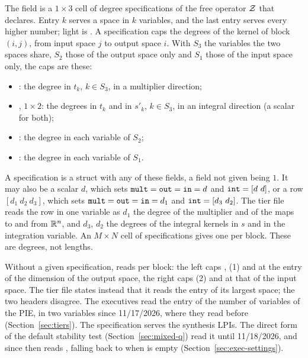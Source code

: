 The field  is a $1\times3$ cell of degree specifications of the free operator $\mathcal{Z}$ that  declares. Entry $k$ serves a space in $k$ variables, and the last entry serves every higher number; light is . A specification caps the degrees of the kernel of block $(i,j)$, from input space $j$ to output space $i$. With $S_3$ the variables the two spaces share, $S_2$ those of the output space only and $S_1$ those of the input space only, the caps are these:
\begin{itemize}\setlength\itemsep{0pt}
\item {}: the degree in $t_k$, $k\in S_3$, in a multiplier direction;
\item {}, $1\times2$: the degrees in $t_k$ and in $s'_k$, $k\in S_3$, in an integral direction (a scalar for both);
\item {}: the degree in each variable of $S_2$;
\item {}: the degree in each variable of $S_1$.
\end{itemize}
A specification is a struct with any of these fields, a field not given being $1$. It may also be a scalar $d$, which sets $\texttt{mult}=\texttt{out}=\texttt{in}=d$ and $\texttt{int}=[d\ d]$, or a row $[d_1\ d_2\ d_3]$, which sets $\texttt{mult}=\texttt{out}=\texttt{in}=d_1$ and $\texttt{int}=[d_3\ d_2]$. The tier file reads the row in one variable as $d_1$ the degree of the multiplier and of the maps to and from $\mathbb{R}^n$, and $d_3$, $d_2$ the degrees of the integral kernels in $s$ and in the integration variable. An $M\times N$ cell of specifications gives one per block. These are degrees, not lengths.

Without a given specification,  reads  per block: the left caps , (1) and  at the entry of the dimension of the output space, the right caps (2) and  at that of the input space. The tier file states instead that it reads the entry of its largest space; the two headers disagree. The executives read the entry of the number of variables of the PIE, in two variables  since 11/17/2026, where they read  before (Section~\ref{sec:tiers}). The specification serves the synthesis LPIs. The direct form of the default stability test (Section~\ref{sec:mixed-q}) read it until 11/18/2026, and since then reads , falling back to  when  is empty (Section~\ref{sec:exec-settings}).

